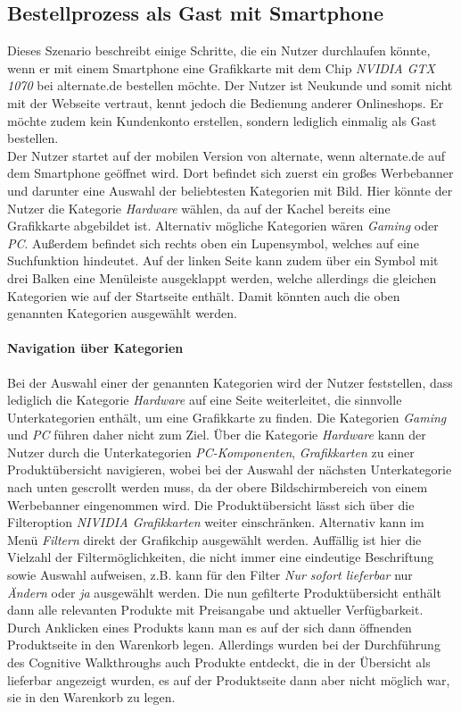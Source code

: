\documentclass[	12pt, 
				a4paper, 
				BCOR=10mm, %
				DIV=12, 
				parskip=half, %
				headings=small, %
				twoside, %
				ngerman,
				bibliography=totoc,index=totoc, listof=totoc,
				numbers=noendperiod
				]{scrbook} %
\theoremstyle{plain}%
\theoremstyle{definition}
\theoremstyle{remark}
\begin{document}
\subsection{Bestellprozess als Gast mit Smartphone}
Dieses Szenario beschreibt einige Schritte, die ein Nutzer durchlaufen könnte, wenn er mit einem Smartphone eine Grafikkarte mit dem Chip \textit{NVIDIA GTX 1070} bei alternate.de bestellen möchte. Der Nutzer ist Neukunde und somit nicht mit der Webseite vertraut, kennt jedoch die Bedienung anderer Onlineshops. Er möchte zudem kein Kundenkonto erstellen, sondern lediglich einmalig als Gast bestellen.\\
Der Nutzer startet auf der mobilen Version von alternate, wenn alternate.de auf dem Smartphone geöffnet wird. Dort befindet sich zuerst ein großes Werbebanner und darunter eine Auswahl der beliebtesten Kategorien mit Bild. Hier könnte der Nutzer die Kategorie \textit{Hardware} wählen, da auf der Kachel bereits eine Grafikkarte abgebildet ist. Alternativ mögliche Kategorien wären \textit{Gaming} oder \textit{PC}. Außerdem befindet sich rechts oben ein Lupensymbol, welches auf eine Suchfunktion hindeutet. Auf der linken Seite kann zudem über ein Symbol mit drei Balken eine Menüleiste ausgeklappt werden, welche allerdings die gleichen Kategorien wie auf der Startseite enthält. Damit könnten auch die oben genannten Kategorien ausgewählt werden.

\paragraph{Navigation über Kategorien} Bei der Auswahl einer der genannten Kategorien wird der Nutzer feststellen, dass lediglich die Kategorie \textit{Hardware} auf eine Seite weiterleitet, die sinnvolle Unterkategorien enthält, um eine Grafikkarte zu finden. Die Kategorien \textit{Gaming} und \textit{PC} führen daher nicht zum Ziel. Über die Kategorie \textit{Hardware} kann der Nutzer durch die Unterkategorien \textit{PC-Komponenten}, \textit{Grafikkarten} zu einer Produktübersicht navigieren, wobei bei der Auswahl der nächsten Unterkategorie nach unten gescrollt werden muss, da der obere Bildschirmbereich von einem Werbebanner eingenommen wird. Die Produktübersicht lässt sich über die Filteroption \textit{NIVIDIA Grafikkarten} weiter einschränken. Alternativ kann im Menü \textit{Filtern} direkt der Grafikchip ausgewählt werden. Auffällig ist hier die Vielzahl der Filtermöglichkeiten, die nicht immer eine eindeutige Beschriftung sowie Auswahl aufweisen, z.B. kann für den Filter \textit{Nur sofort lieferbar} nur \textit{Ändern} oder \textit{ja} ausgewählt werden. Die nun gefilterte Produktübersicht enthält dann alle relevanten Produkte mit Preisangabe und aktueller Verfügbarkeit. Durch Anklicken eines Produkts kann man es auf der sich dann öffnenden Produktseite in den Warenkorb legen. Allerdings wurden bei der Durchführung des Cognitive Walkthroughs auch Produkte entdeckt, die in der Übersicht als lieferbar angezeigt wurden, es auf der Produktseite dann aber nicht möglich war, sie in den Warenkorb zu legen.
\end{document}
